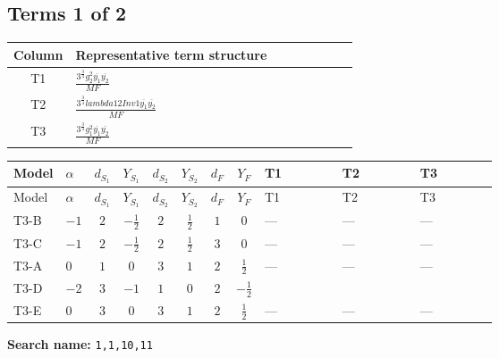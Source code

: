 \documentclass[8pt]{article}
\begin{document}
\begin{landscape}
\subsection*{Terms 1 of 2}
\begin{center}
\begin{tabular}{@{}c >{\raggedright\arraybackslash}p{0.82\linewidth}@{}}
\toprule
Column & Representative term structure \\
\midrule
T1 & \(\displaystyle \frac{3^{\frac{3}{4}} g_{2}^{2} \overline{y_{1}} \overline{y_{2}}}{MF}\) \\
\midrule
T2 & \(\displaystyle \frac{3^{\frac{3}{4}} lambda12Inv1 \overline{y_{1}} \overline{y_{2}}}{MF}\) \\
\midrule
T3 & \(\displaystyle \frac{3^{\frac{3}{4}} g_{1}^{2} \overline{y_{1}} \overline{y_{2}}}{MF}\) \\
\midrule
\bottomrule
\end{tabular}
\end{center}
\smallskip
\tiny
\begin{longtable}{@{}llcccccc >{\raggedright\arraybackslash}p{0.21\linewidth} >{\raggedright\arraybackslash}p{0.21\linewidth} >{\raggedright\arraybackslash}p{0.21\linewidth}@{}}
\toprule
Model & $\alpha$ & $d_{S_1}$ & $Y_{S_1}$ & $d_{S_2}$ & $Y_{S_2}$ & $d_F$ & $Y_F$ & T1 & T2 & T3 \\
\midrule
\endfirsthead
\toprule
Model & $\alpha$ & $d_{S_1}$ & $Y_{S_1}$ & $d_{S_2}$ & $Y_{S_2}$ & $d_F$ & $Y_F$ & T1 & T2 & T3 \\
\midrule
\endhead
T3-B & $-1$ & $2$ & $-\frac{1}{2}$ & $2$ & $\frac{1}{2}$ & $1$ & $0$ & --- & --- & --- \\
\midrule
T3-C & $-1$ & $2$ & $-\frac{1}{2}$ & $2$ & $\frac{1}{2}$ & $3$ & $0$ & --- & --- & --- \\
\midrule
T3-A & $0$ & $1$ & $0$ & $3$ & $1$ & $2$ & $\frac{1}{2}$ & --- & --- & --- \\
\midrule
T3-D & $-2$ & $3$ & $-1$ & $1$ & $0$ & $2$ & $-\frac{1}{2}$ & \scriptsize\adjustbox{max width=\linewidth}{$\begin{gathered} - \frac{11 \cdot 3^{\frac{3}{4}} g_{2}^{2} \overline{y_{1}} \overline{y_{2}}}{8 MF}\end{gathered}$} & \scriptsize\adjustbox{max width=\linewidth}{$\begin{gathered} - \frac{3^{\frac{3}{4}} lambda12Inv1 \overline{y_{1}} \overline{y_{2}}}{6 MF}\end{gathered}$} & \scriptsize\adjustbox{max width=\linewidth}{$\begin{gathered} - \frac{3^{\frac{3}{4}} g_{1}^{2} \overline{y_{1}} \overline{y_{2}}}{8 MF}\end{gathered}$} \\
\midrule
T3-E & $0$ & $3$ & $0$ & $3$ & $1$ & $2$ & $\frac{1}{2}$ & --- & --- & --- \\
\midrule
\bottomrule
\end{longtable}
\clearpage
\noindent\textbf{Search name: }\texttt{1,1,10,11}\par\smallskip

\end{landscape}
\end{document}
